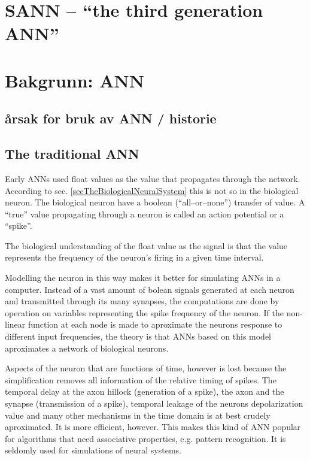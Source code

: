 \section{SANN -- ``the third generation ANN''}














\section{Bakgrunn: ANN}
	\subsection{årsak for bruk av ANN / historie}
	
	\subsection{The traditional ANN}
Early ANNs used float values as the value that propagates through the network. According to sec. \ref{secTheBiologicalNeuralSystem} this is not so in the biological neuron.
The biological neuron have a boolean (``all--or--none'') transfer of value. A ``true'' value propagating through a neuron is called an action potential or a ``spike''.

The biological understanding of the float value as the signal is that the value represents the frequency of the neuron's firing in a given time interval.

Modelling the neuron in this way makes it better for simulating ANNs in a computer. 
Instead of a vast amount of bolean signals generated at each neuron and transmitted through its many synapses, the computations are done by operation on variables representing the spike frequency of the neuron.
If the non-linear function at each node is made to aproximate the neurons response to different input frequencies, the theory is that ANNs based on this model aproximates a network of biological neurons.

Aspects of the neuron that are functions of time, however is lost because the simplification removes all information of the relative timing of spikes.
The temporal delay at the axon hillock (generation of a spike), the axon and the synapse (transmission of a spike), temporal leakage of the neurons depolarization value and many other mechanisms in the time domain is at best crudely aproximated.
It is more efficient, however. This makes this kind of ANN popular for algorithms that need associative properties, e.g. pattern recognition. It is seldomly used for simulations of neural systems.

